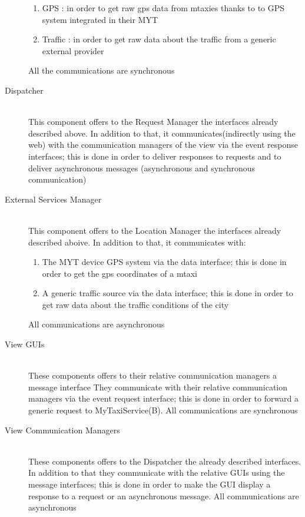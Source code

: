 \documentclass[11pt,titlepage]{article} %
\begin{document}
\begin{description}
	\begin{enumerate}
	          \item GPS : in order to get raw gps data from mtaxies thanks to to GPS system integrated in their MYT
	          \item Traffic : in order to get raw data about the traffic from a generic external provider
	\end{enumerate}
	All the communications are synchronous

      \item [Dispatcher] \hfill \\
          This component offers to the Request Manager the interfaces already described above.
          In addition to that, it communicates(indirectly using the web) with the communication managers of the view
          via the event response interfaces; this is done in order to deliver responses to requests and to deliver asynchronous messages
          (asynchronous and synchronous communication)

      \item [External Services Manager] \hfill \\
          This component offers to the Location Manager the interfaces already described aboive.
          In addition to that, it communicates with:
	\begin{enumerate}
	          \item The MYT device GPS system via the data interface; this is done in order to get the gps coordinates of a mtaxi
	          \item A generic traffic source via the data interface; this is done in order to get raw data about the traffic
	          conditions of the city
	\end{enumerate}
          All communications are asynchronous

      \item [View GUIs] \hfill \\
          These components offers to their relative communication managers a message interface
          They communicate with their relative communication managers via the event request interface; this is
          done in order to forward a generic request to MyTaxiService(B).\newline
          All communications are synchronous

      \item [View Communication Managers] \hfill \\
          These components offers to the Dispatcher the already described interfaces. In addition to that
          they communicate with the relative GUIs using the message interfaces; this is done in order
          to make the GUI display a response to a request or an asynchronous message.\newline
          All communications are asynchronous

\end{description}
\end{document}

